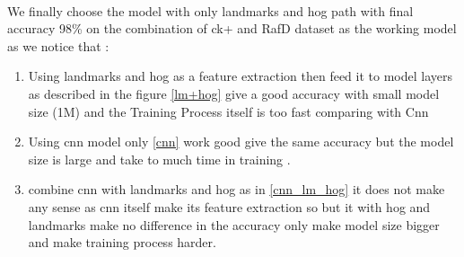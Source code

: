 \paragraph{}
We finally choose the model with only landmarks and hog path with final accuracy 98\% on the combination of ck+ and RafD dataset as the working model as we notice that :
\begin{enumerate}
	\item Using landmarks and hog as a feature extraction then feed it to model layers as described in the figure \ref{lm+hog} give a good accuracy with small model size (1M) and the Training Process itself is too fast comparing with Cnn
	\item Using cnn model only \ref{cnn} work good give the same accuracy but the model size is large and take to much time in training .
	\item combine cnn with landmarks and hog as in \ref{cnn_lm_hog} it does not make any sense as cnn itself make its feature extraction so but it with hog and landmarks make no difference in the accuracy only make model size bigger and make training process harder. 
\end{enumerate} 